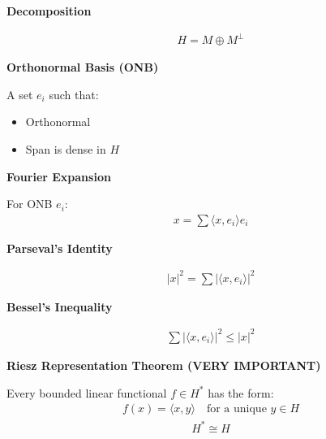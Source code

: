 \documentclass[12pt,a4paper]{report}
\begin{document}
\begin{description}
\begin{description}
    \item \textbf{Decomposition}

\begin{align*}
H = M \oplus M^\perp
\end{align*}
\end{description}

\item {}

\begin{description}
    \item \textbf{Orthonormal Basis (ONB)}

A set ${e_i}$ such that:

\begin{itemize}
\item Orthonormal
\item Span is dense in $H$
\end{itemize}

    \item \textbf{Fourier Expansion}

For ONB ${e_i}$:
\begin{align*}
x = \sum \langle x,e_i\rangle e_i
\end{align*}

    \item \textbf{Parseval’s Identity}

\begin{align*}
|x|^2 = \sum |\langle x,e_i\rangle|^2
\end{align*}

    \item \textbf{Bessel’s Inequality}

\begin{align*}
\sum |\langle x,e_i\rangle|^2 \le |x|^2
\end{align*}
\end{description}

\item {}

\begin{description}
    \item \textbf{Riesz Representation Theorem (VERY IMPORTANT)}

Every bounded linear functional $f \in H^*$ has the form:
\begin{align*}
f(x) = \langle x,y\rangle
\quad \text{for a unique } y \in H
\end{align*}
\begin{align*}
H^* \cong H
\end{align*}


\end{description}
\end{description}
\end{document}
